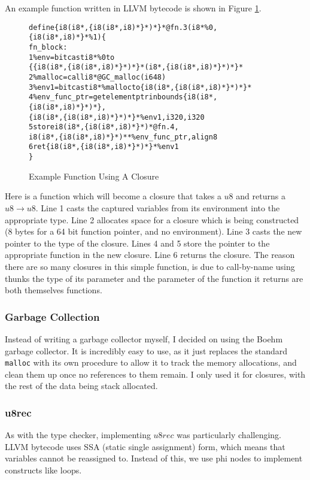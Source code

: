 An example function written in LLVM bytecode is shown in Figure \ref{fig:closure}.
\begin{figure}
    \begin{alltt}
define \{ i8 (i8*, \{ i8 (i8*, i8)* \}*)* \}* @fn.3(i8* \%0, \{ i8 (i8*, i8)* \}* \%1) \{
fn_block:
1 \%env = bitcast i8* \%0 to
    \{ \{ i8 (i8*, \{ i8 (i8*, i8)* \}*)* \}* (i8*, \{ i8 (i8*, i8)* \}*)* \}*
2 \%malloc = call i8* @GC_malloc(i64 8)
3 \%env1 = bitcast i8* \%malloc to \{ i8 (i8*, \{ i8 (i8*, i8)* \}*)* \}*
4 \%env_func_ptr = getelementptr inbounds \{ i8 (i8*, \{ i8 (i8*, i8)* \}*)* \},
    \{ i8 (i8*, \{ i8 (i8*, i8)* \}*)* \}* \%env1, i32 0, i32 0
5 store i8 (i8*, \{ i8 (i8*, i8)* \}*)* @fn.4,
    i8 (i8*, \{ i8 (i8*, i8)* \}*)** \%env_func_ptr, align 8
6 ret \{ i8 (i8*, \{ i8 (i8*, i8)* \}*)* \}* \%env1
\}
    \end{alltt}
    \caption{Example Function Using A Closure}
    \label{fig:closure}
\end{figure}
Here is a function which will become a closure that takes a $u8$ and returns a $u8 \rightarrow u8$.
Line 1 casts the captured variables from its environment into the appropriate type.
Line 2 allocates space for a closure which is being constructed
(8 bytes for a 64 bit function pointer, and no environment).
Line 3 casts the new pointer to the type of the closure.
Lines 4 and 5 store the pointer to the appropriate function in the new closure.
Line 6 returns the closure.
The reason there are so many closures in this simple function, is due to call-by-name using thunks
the type of its parameter and the parameter of the function it returns are both themselves functions.

\subsubsection{Garbage Collection}

Instead of writing a garbage collector myself, I decided on using the Boehm garbage collector.
It is incredibly easy to use, as it just replaces the standard \texttt{malloc} with its own procedure
to allow it to track the memory allocations, and clean them up once no references to them remain.
I only used it for closures, with the rest of the data being stack allocated.

\subsubsection{u8rec}

As with the type checker, implementing $u8rec$ was particularly challenging.
LLVM bytecode uses SSA (static single assignment) form, which means that variables cannot be reassigned to.
Instead of this, we use phi nodes to implement constructs like loops.

